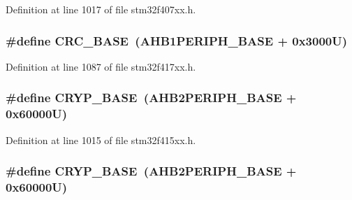 Definition at line 1017 of file stm32f407xx.\+h.

\subsubsection[{\texorpdfstring{C\+R\+C\+\_\+\+B\+A\+SE}{CRC_BASE}}]{\setlength{\rightskip}{0pt plus 5cm}\#define C\+R\+C\+\_\+\+B\+A\+SE~({\bf A\+H\+B1\+P\+E\+R\+I\+P\+H\+\_\+\+B\+A\+SE} + 0x3000\+U)}\hypertarget{group___peripheral__registers__structures_ga656a447589e785594cbf2f45c835ad7e}{}\label{group___peripheral__registers__structures_ga656a447589e785594cbf2f45c835ad7e}


Definition at line 1087 of file stm32f417xx.\+h.

\subsubsection[{\texorpdfstring{C\+R\+Y\+P\+\_\+\+B\+A\+SE}{CRYP_BASE}}]{\setlength{\rightskip}{0pt plus 5cm}\#define C\+R\+Y\+P\+\_\+\+B\+A\+SE~({\bf A\+H\+B2\+P\+E\+R\+I\+P\+H\+\_\+\+B\+A\+SE} + 0x60000\+U)}\hypertarget{group___peripheral__registers__structures_ga019f3ad3b3212e56b45984efd8b8efef}{}\label{group___peripheral__registers__structures_ga019f3ad3b3212e56b45984efd8b8efef}


Definition at line 1015 of file stm32f415xx.\+h.

\subsubsection[{\texorpdfstring{C\+R\+Y\+P\+\_\+\+B\+A\+SE}{CRYP_BASE}}]{\setlength{\rightskip}{0pt plus 5cm}\#define C\+R\+Y\+P\+\_\+\+B\+A\+SE~({\bf A\+H\+B2\+P\+E\+R\+I\+P\+H\+\_\+\+B\+A\+SE} + 0x60000\+U)}\hypertarget{group___peripheral__registers__structures_ga019f3ad3b3212e56b45984efd8b8efef}{}\label{group___peripheral__registers__structures_ga019f3ad3b3212e56b45984efd8b8efef}


